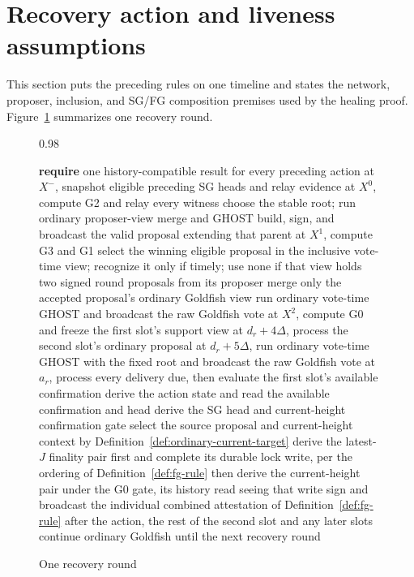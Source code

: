 \section{Recovery action and liveness assumptions}\label{sec:rounds}

This section puts the preceding rules on one timeline and states the network,
proposer, inclusion, and SG/FG composition premises used by the healing
proof.  Figure~\ref{alg:recovery-action} summarizes one recovery round.

\begin{figure}[H]
\caption{One recovery round}\label{fig:recovery-round}
\label{alg:recovery-action}
\begin{center}
\begin{boxedminipage}{0.98\textwidth}
\scriptsize
\begin{algorithmic}[1]
  \State \textbf{require} one history-compatible result for every preceding
    action
  \State at \(X^-\), snapshot eligible preceding SG heads and relay evidence
  \State at \(X^0\), compute G2 and relay every witness
    \State choose the stable root; run ordinary proposer-view merge and GHOST
    \State build, sign, and broadcast the valid proposal extending that parent
  \EndIf
  \State at \(X^1\), compute G3 and G1
  \State select the winning eligible proposal in the inclusive
    vote-time view; recognize it only if timely; use none if that
    view holds two signed round proposals from its proposer
  \State merge only the accepted proposal's ordinary Goldfish view
  \State run ordinary vote-time GHOST and broadcast the raw Goldfish vote
  \State at \(X^2\), compute G0 and freeze the first slot's support view
  \State at \(d_r+4\Delta\), process the second slot's ordinary proposal
  \State at \(d_r+5\Delta\), run ordinary vote-time GHOST with the fixed root
    and broadcast the raw Goldfish vote
  \State at \(a_r\), process every delivery due, then evaluate the first slot's
    available confirmation
  \State derive the action state and read the available confirmation and head
  \State derive the SG head and current-height confirmation gate
  \State select the source proposal and current-height context by
    Definition~\ref{def:ordinary-current-target}
  \State derive the latest-\(J\) finality pair first and complete its
    durable lock write, per the ordering of Definition~\ref{def:fg-rule}
  \State then derive the current-height pair under the G0 gate, its
    history read seeing that write
  \State sign and broadcast the individual combined attestation of
    Definition~\ref{def:fg-rule}
  \State after the action, the rest of the second slot and any later slots
    continue ordinary Goldfish until the next recovery round
\EndFunction
\end{algorithmic}
\end{boxedminipage}
\end{center}
\end{figure}

